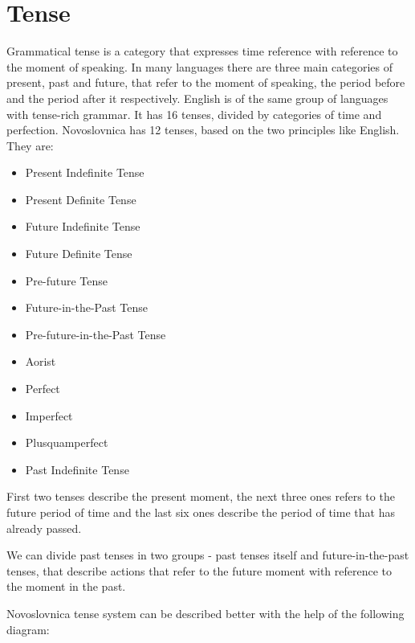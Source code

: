 \section{Tense}

Grammatical tense is a category that expresses time reference with reference to the moment of speaking. In many languages there are three main categories of present, past and future, that refer to the moment of speaking, the period before and the period after it respectively. English is of the same group of languages with tense-rich grammar. It has 16 tenses, divided by categories of time and perfection. Novoslovnica has 12 tenses, based on the two principles like English. They are:

\begin{itemize}
	\item Present Indefinite Tense
	\item Present Definite Tense
	\item Future Indefinite Tense
	\item Future Definite Tense
	\item Pre-future Tense
	\item Future-in-the-Past Tense
	\item Pre-future-in-the-Past Tense
	\item Aorist
	\item Perfect
	\item Imperfect
	\item Plusquamperfect
	\item Past Indefinite Tense
\end{itemize}

First two tenses describe the present moment, the next three ones refers to the future period of time and the last six ones describe the period of time that has already passed.

We can divide past tenses in two groups - past tenses itself and future-in-the-past tenses, that describe actions that refer to the future moment with reference to the moment in the past.

Novoslovnica tense system can be described better with the help of the following diagram:

